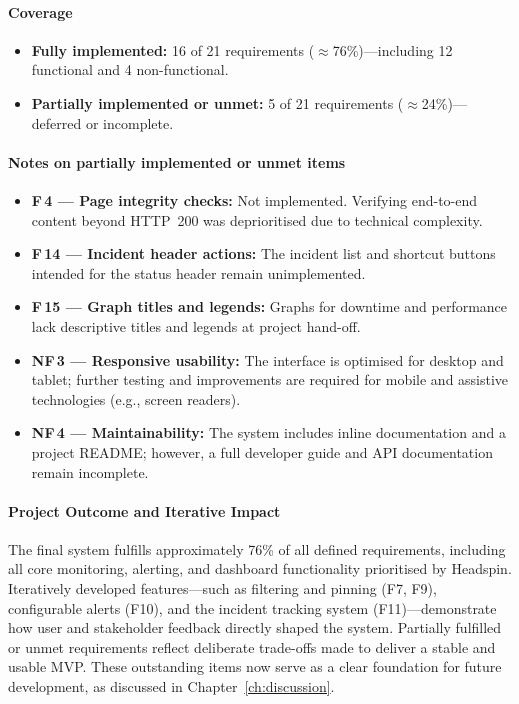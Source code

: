 {\paragraph{Coverage}
\begin{itemize}
    \item \textbf{Fully implemented:} 16 of 21 requirements ($\approx$76\%)—including 12 functional and 4 non-functional.
    \item \textbf{Partially implemented or unmet:} 5 of 21 requirements ($\approx$24\%)—deferred or incomplete.
\end{itemize}

\paragraph{Notes on partially implemented or unmet items}
\begin{itemize}
    \item \textbf{F\,4 — Page integrity checks:} Not implemented. Verifying end-to-end content beyond HTTP~200 was deprioritised due to technical complexity.
    \item \textbf{F\,14 — Incident header actions:} The incident list and shortcut buttons intended for the status header remain unimplemented.
    \item \textbf{F\,15 — Graph titles and legends:} Graphs for downtime and performance lack descriptive titles and legends at project hand-off.
    \item \textbf{NF\,3 — Responsive usability:} The interface is optimised for desktop and tablet; further testing and improvements are required for mobile and assistive technologies (e.g., screen readers).
    \item \textbf{NF\,4 — Maintainability:} The system includes inline documentation and a project README; however, a full developer guide and API documentation remain incomplete.
\end{itemize}

\paragraph{Project Outcome and Iterative Impact}
The final system fulfills approximately 76\% of all defined requirements, including all core monitoring, alerting, and dashboard functionality prioritised by Headspin. Iteratively developed features—such as filtering and pinning (F7, F9), configurable alerts (F10), and the incident tracking system (F11)—demonstrate how user and stakeholder feedback directly shaped the system. Partially fulfilled or unmet requirements reflect deliberate trade-offs made to deliver a stable and usable MVP. These outstanding items now serve as a clear foundation for future development, as discussed in Chapter~\ref{ch:discussion}.



}
